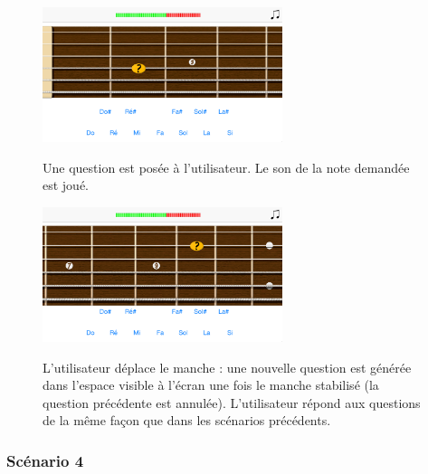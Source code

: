 \documentclass{scrreprt}
\begin{document}
\begin{figure}[!ht]
  \begin{minipage}{0.55\linewidth}
    \includegraphics[width=7cm]{images/maquette_usecase/clavier/question.png}
  \end{minipage}\hfill
  \begin{minipage}{0.5\linewidth}
  {Une question est posée à l'utilisateur. Le son de la note demandée est joué.}
   \end{minipage}
\end{figure}

\bigbreak


\begin{figure}[!ht]
  \begin{minipage}{0.55\linewidth}
    \includegraphics[width=7cm]{images/maquette_usecase/clavier/question_manche_decale.png}
  \end{minipage}\hfill
  \begin{minipage}{0.5\linewidth}
  {L'utilisateur déplace le manche : une nouvelle question est générée dans l'espace visible à l'écran une fois le manche stabilisé (la question précédente est annulée). 
  L'utilisateur répond aux questions de la même façon que dans les scénarios précédents.}
   \end{minipage}
\end{figure}

\bigbreak


\subsubsection{Scénario 4}
\bigbreak
\end{document}
